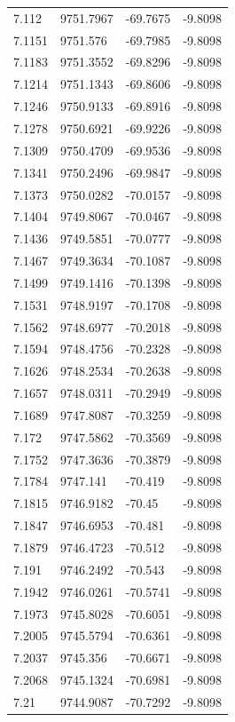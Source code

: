 \begin{table}[H]
\begin{tabular}{llll}
7.112 & 9751.7967 & -69.7675 & -9.8098 \\
7.1151 & 9751.576 & -69.7985 & -9.8098 \\
7.1183 & 9751.3552 & -69.8296 & -9.8098 \\
7.1214 & 9751.1343 & -69.8606 & -9.8098 \\
7.1246 & 9750.9133 & -69.8916 & -9.8098 \\
7.1278 & 9750.6921 & -69.9226 & -9.8098 \\
7.1309 & 9750.4709 & -69.9536 & -9.8098 \\
7.1341 & 9750.2496 & -69.9847 & -9.8098 \\
7.1373 & 9750.0282 & -70.0157 & -9.8098 \\
7.1404 & 9749.8067 & -70.0467 & -9.8098 \\
7.1436 & 9749.5851 & -70.0777 & -9.8098 \\
7.1467 & 9749.3634 & -70.1087 & -9.8098 \\
7.1499 & 9749.1416 & -70.1398 & -9.8098 \\
7.1531 & 9748.9197 & -70.1708 & -9.8098 \\
7.1562 & 9748.6977 & -70.2018 & -9.8098 \\
7.1594 & 9748.4756 & -70.2328 & -9.8098 \\
7.1626 & 9748.2534 & -70.2638 & -9.8098 \\
7.1657 & 9748.0311 & -70.2949 & -9.8098 \\
7.1689 & 9747.8087 & -70.3259 & -9.8098 \\
7.172 & 9747.5862 & -70.3569 & -9.8098 \\
7.1752 & 9747.3636 & -70.3879 & -9.8098 \\
7.1784 & 9747.141 & -70.419 & -9.8098 \\
7.1815 & 9746.9182 & -70.45 & -9.8098 \\
7.1847 & 9746.6953 & -70.481 & -9.8098 \\
7.1879 & 9746.4723 & -70.512 & -9.8098 \\
7.191 & 9746.2492 & -70.543 & -9.8098 \\
7.1942 & 9746.0261 & -70.5741 & -9.8098 \\
7.1973 & 9745.8028 & -70.6051 & -9.8098 \\
7.2005 & 9745.5794 & -70.6361 & -9.8098 \\
7.2037 & 9745.356 & -70.6671 & -9.8098 \\
7.2068 & 9745.1324 & -70.6981 & -9.8098 \\
7.21 & 9744.9087 & -70.7292 & -9.8098 \\

\end{tabular}
\end{table}
